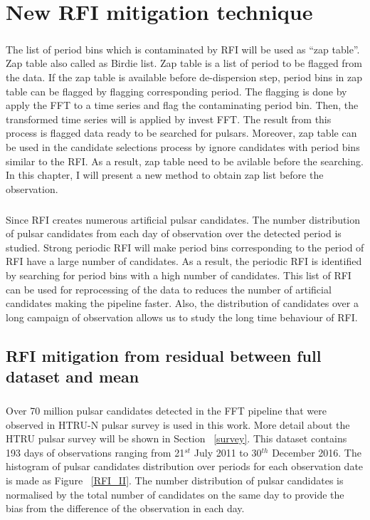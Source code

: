 \documentclass[thesis_msc.tex]{subfiles}
\begin{document}
\chapter{New RFI mitigation technique} \label{RFI}

     \paragraph{} The list of period bins which is contaminated by RFI will be used as ``zap table''. Zap table also called as Birdie list. Zap table is a list of period to be flagged from the data. If the zap table is available before de-dispersion step, period bins in zap table can be flagged by flagging corresponding period. The flagging is done by apply the FFT to a time series and flag the contaminating period bin. Then, the transformed time series will is applied by invest FFT. The result from this process is flagged data ready to be searched for pulsars. Moreover, zap table can be used in the candidate selections process by ignore candidates with period bins similar to the RFI. As a result, zap table need to be avilable before the searching. In this chapter, I will present a new method to obtain zap list before the observation.
     
     \paragraph{} Since RFI creates numerous artificial pulsar candidates. The number distribution of pulsar candidates from each day of observation over the detected period is studied. Strong periodic RFI will make period bins corresponding to the period of RFI have a large number of candidates. As a result, the periodic RFI is identified by searching for period bins with a high number of candidates. This list of RFI can be used for reprocessing of the data to reduces the number of artificial candidates making the pipeline faster. Also, the distribution of candidates over a long campaign of observation allows us to study the long time behaviour of RFI. 

     \section{RFI mitigation from residual between full dataset and mean}
    \paragraph{} Over 70 million pulsar candidates detected in the FFT pipeline that were observed in HTRU-N pulsar survey is used in this work. More detail about the HTRU pulsar survey will be shown in Section ~\ref{survey}.  This dataset contains 193 days of observations ranging from 21$^{st}$  July 2011 to 30$^{th}$ December 2016. The histogram of pulsar candidates distribution over periods for each observation date is made as Figure ~\ref{RFI_II}. The number distribution of pulsar candidates is normalised by the total number of candidates on the same day to provide the bias from the difference of the observation in each day.
\end{document}
